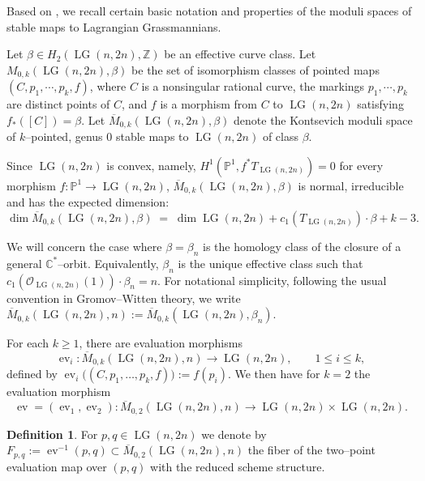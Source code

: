 \documentclass[10pt]{amsart}
\theoremstyle{definition}
\newtheorem{definition}[theorem]{Definition}
\newcommand{\C}{\mathbb{C}}
\newcommand{\Pbb}{\mathbb{P}}
\newcommand{\Mbar}{\overline{M}}
\newcommand{\OO}{\mathcal{O}}
\newcommand{\LG}{\operatorname{LG}}
\newcommand{\ev}{\operatorname{ev}}
\theoremstyle{plain} %
\begin{document}
Based on \cite{KontsevichManin94,FP97,KV}, we recall certain basic notation and properties of the moduli spaces of stable maps to Lagrangian Grassmannians.


Let $\beta \in H_2(\LG(n,2n),\mathbb{Z})$ be an effective curve class.  Let
$M_{0,k}(\LG(n,2n),\beta)$ be the set of isomorphism classes of pointed maps $(C,p_1,\cdots, p_k,f)$, where $C$ is a nonsingular rational curve, the markings $p_1,\cdots, p_k$ are
distinct points of $C$, and $f$ is a morphism from $C$ to $\LG(n,2n)$ satisfying $f_*([C]) =\beta$.
Let $\Mbar_{0,k}(\LG(n,2n),\beta)$ denote the Kontsevich moduli space of $k$--pointed, genus $0$ stable maps to $\LG(n,2n)$ of class $\beta$. 

Since $\LG(n,2n)$ is convex, namely,  $H^1(\Pbb^1,f^*T_{\LG(n,2n)})=0$ for every morphism $f\colon \Pbb^1 \rightarrow \LG(n,2n)$,  $\Mbar_{0,k}(\LG(n,2n),\beta)$ is normal, irreducible and has the expected dimension:
\begin{equation}\label{eq:dim-M0k}
\dim \Mbar_{0,k}(\LG(n,2n),\beta) \;=\; \dim \LG(n,2n) + c_1(T_{\LG(n,2n)})\cdot \beta + k - 3.
\end{equation}

We will concern the case where $\beta = \beta_n$ is the homology class of the closure of a general $\C^*$--orbit. Equivalently, $\beta_n$ is the unique effective class such that $c_1(\OO_{\LG(n,2n)}(1))\cdot \beta_n = n$.
For notational simplicity, following the usual convention in Gromov--Witten theory, we write $\Mbar_{0,k}(\LG(n,2n),n) := \Mbar_{0,k}(\LG(n,2n),\beta_n)$.



 


For each $k\geq 1$, there are evaluation morphisms
\[
\ev_i \colon \Mbar_{0,k}(\LG(n,2n),n) \longrightarrow \LG(n,2n),\qquad 1\leq i\leq k,
\]
defined by $\ev_i\bigl((C,p_1,\dots,p_k,f)\bigr) := f(p_i)$. We then have for $k=2$ the evaluation morphism
\[
\ev = (\ev_1,\ev_2) \colon \Mbar_{0,2}(\LG(n,2n),n) \longrightarrow \LG(n,2n)\times \LG(n,2n).
\]
\begin{definition}
For $p,q \in \LG(n,2n)$ we denote by $F_{p,q} := \ev^{-1}(p,q) \subset \Mbar_{0,2}(\LG(n,2n),n)$ the fiber of the two--point evaluation map over $(p,q)$ with the reduced scheme structure.
\end{definition}
\end{document}
